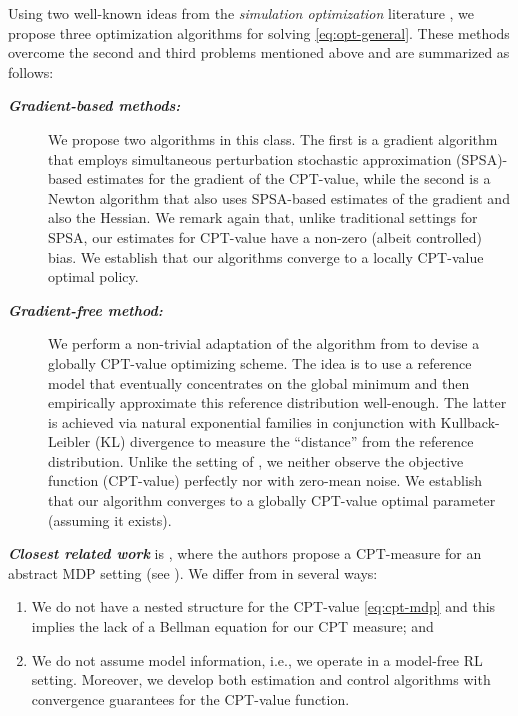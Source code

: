 \documentclass[11pt,letterpaper,english]{article}
\begin{document}
Using two well-known ideas from the \textit{simulation optimization} literature \cite{fu2015handbook}, we propose three optimization algorithms for solving \eqref{eq:opt-general}. These methods overcome the second and third problems mentioned above and are summarized as follows:
\begin{description}
\item[\textbf{\textit{Gradient-based methods:}}] We propose two algorithms in this class. The first is a gradient algorithm that employs simultaneous perturbation stochastic approximation (SPSA)-based estimates for the gradient of the CPT-value, while the second is a Newton algorithm that also uses SPSA-based estimates of the gradient and also the Hessian. We remark again that, unlike traditional settings for SPSA, our estimates for CPT-value have a non-zero (albeit controlled) bias. We establish that our algorithms converge to a locally CPT-value optimal policy. 
\item[\textbf{\textit{Gradient-free method:}}] We perform a non-trivial adaptation of the algorithm from \cite{chang2013simulation} to devise a globally CPT-value optimizing scheme. The idea is to use a reference model that eventually concentrates on the global minimum and then empirically approximate this reference distribution well-enough. The latter is achieved via natural exponential families in conjunction with Kullback-Leibler (KL) divergence to measure the ``distance'' from the reference distribution. Unlike the setting of \cite{chang2013simulation}, we neither observe the objective function (CPT-value) perfectly nor with zero-mean noise. We establish that our algorithm converges to a globally CPT-value optimal parameter (assuming it exists).
\end{description}


\noindent
\textit{\textbf{Closest related work}} is \cite{lin2013stochastic}, where the authors propose a CPT-measure for an abstract MDP setting (see \cite{bertsekas2013abstract}). We differ from \cite{lin2013stochastic} in several ways:
\begin{enumerate}[\bfseries (i)]
\item We do not have a nested structure for the CPT-value \eqref{eq:cpt-mdp} and this implies the lack of a Bellman equation for our CPT measure; and
\item We do not assume model information, i.e., we operate in a model-free RL setting. Moreover, we develop both estimation and control algorithms with convergence guarantees for the CPT-value function.
\end{enumerate}
\end{document}

